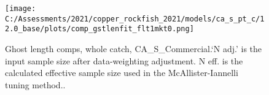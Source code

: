 \documentclass[11pt,
  english,
  a4paper,
]{article}
\begin{document}
\leavevmode\tagmcend\tagstructend


\begin{figure}
\centering
\texttt{[image: C:/Assessments/2021/copper\_rockfish\_2021/models/ca\_s\_pt\_c/12.0\_base/plots/comp\_gstlenfit\_flt1mkt0.png]}
\caption{Ghost length comps, whole catch, CA\_S\_Commercial.`N adj.' is the input sample size after data-weighting adjustment. N eff. is the calculated effective sample size used in the McAllister-Iannelli tuning method..\label{fig:comp_gstlenfit_flt1mkt0}}
\end{figure}

\tagmcend\tagstructend
\end{document}
